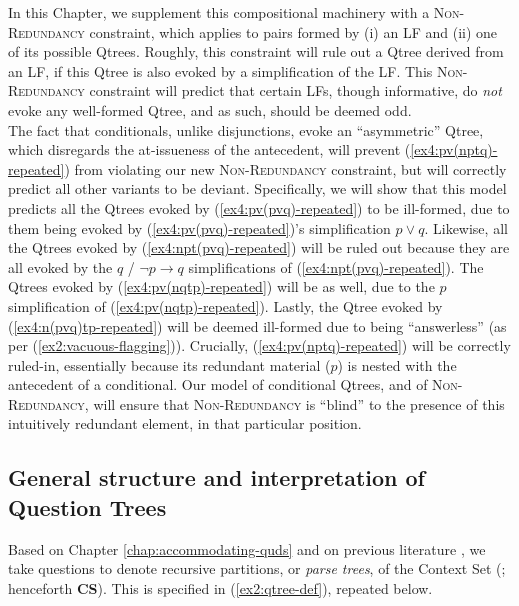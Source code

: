 In this Chapter, we supplement this compositional machinery with a \textsc{Non-Redundancy} constraint, which applies to pairs formed by (i) an LF and (ii) one of its possible Qtrees. Roughly, this constraint will rule out a Qtree derived from an LF, if this Qtree is also evoked by a simplification of the LF. This \textsc{Non-Redundancy} constraint will predict that certain LFs, though informative, do \textit{not} evoke any well-formed Qtree, and as such, should be deemed odd.\\


The fact that conditionals, unlike disjunctions, evoke an ``asymmetric'' Qtree, which disregards the at-issueness of the antecedent, will prevent (\ref{ex4:pv(nptq)-repeated}) from violating our new \textsc{Non-Redundancy} constraint, but will correctly predict all other variants to be deviant. Specifically, we will show that this model predicts all the Qtrees evoked by (\ref{ex4:pv(pvq)-repeated}) to be ill-formed, due to them being evoked by (\ref{ex4:pv(pvq)-repeated})'s simplification $p \vee q$. Likewise, all the Qtrees evoked by
(\ref{ex4:npt(pvq)-repeated}) will be ruled out because they are all evoked by the $q$ / $\neg p \rightarrow q$ simplifications of (\ref{ex4:npt(pvq)-repeated}). The Qtrees evoked by (\ref{ex4:pv(nqtp)-repeated}) will be as well, due to the $p$ simplification of (\ref{ex4:pv(nqtp)-repeated}). Lastly, the Qtree evoked by (\ref{ex4:n(pvq)tp-repeated}) will be deemed ill-formed due to being ``answerless'' (as per (\ref{ex2:vacuous-flagging})). Crucially, (\ref{ex4:pv(nptq)-repeated}) will be correctly ruled-in, essentially because its redundant material ($p$) is nested with the antecedent of a conditional. Our model of conditional Qtrees, and of \textsc{Non-Redundancy}, will ensure that \textsc{Non-Redundancy} is ``blind'' to the presence of this intuitively redundant element, in that particular position.


\subsection{General structure and interpretation of Question Trees}

Based on Chapter \ref{chap:accommodating-quds} and on previous literature \parencite{Buring2003,Riester2019,Ippolito2019,Onea2016,Zhang2022}, we take questions to denote recursive partitions, or \textit{parse trees}, of the Context Set (; henceforth \textbf{CS}). This is specified in (\ref{ex2:qtree-def}), repeated below.

